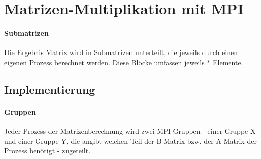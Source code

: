 \section{Matrizen-Multiplikation mit MPI}

\paragraph{Submatrizen}
Die Ergebnis Matrix wird in Submatrizen unterteilt, die jeweils durch einen eigenen Prozess berechnet werden. Diese Blöcke umfassen jeweils  $*$  Elemente.



\subsection{Implementierung}
\paragraph{Gruppen}
Jeder Prozess der Matrizenberechnung wird zwei MPI-Gruppen - einer Gruppe-X und einer Gruppe-Y, die angibt welchen Teil der B-Matrix bzw. der A-Matrix der Prozess benötigt - zugeteilt. 

\label{lst:a6-kernel}



